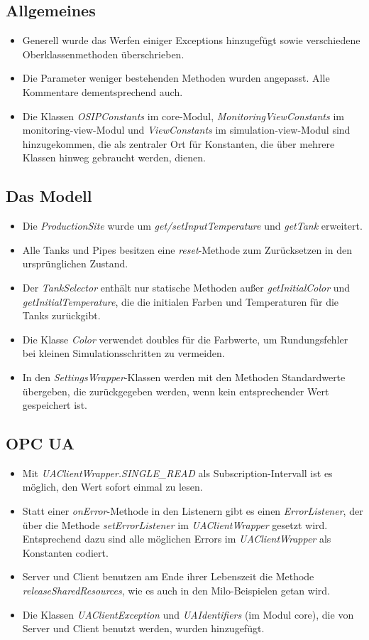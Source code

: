 \documentclass[parskip=full]{scrartcl}
\begin{document}
\subsection{Allgemeines}
\begin{itemize}
 \item Generell wurde das Werfen einiger Exceptions hinzugefügt sowie verschiedene Oberklassenmethoden überschrieben.
 \item Die Parameter weniger bestehenden Methoden wurden angepasst. Alle Kommentare dementsprechend auch.
 \item Die Klassen \emph{OSIPConstants} im core-Modul, \emph{MonitoringViewConstants} im monitoring-view-Modul und \emph{ViewConstants} im simulation-view-Modul sind hinzugekommen, die als zentraler Ort für Konstanten, die über mehrere Klassen hinweg gebraucht werden, dienen.
\end{itemize}

\subsection{Das Modell}
\begin{itemize}
 \item Die \emph{ProductionSite} wurde um \emph{get/setInputTemperature} und \emph{getTank} erweitert.
 \item Alle Tanks und Pipes besitzen eine \emph{reset}-Methode zum Zurücksetzen in den ursprünglichen Zustand.
 \item Der \emph{TankSelector} enthält nur statische Methoden außer \emph{getInitialColor} und \emph{getInitialTemperature}, die die initialen Farben und Temperaturen für die Tanks zurückgibt.
 \item Die Klasse \emph{Color} verwendet doubles für die Farbwerte, um Rundungsfehler bei kleinen Simulationsschritten zu vermeiden.
 \item In den \emph{SettingsWrapper}-Klassen werden mit den Methoden Standardwerte übergeben, die zurückgegeben werden, wenn kein entsprechender Wert gespeichert ist.
\end{itemize}

\subsection{OPC UA}
\begin{itemize}
 \item Mit \emph{UAClientWrapper.SINGLE\_READ} als Subscription-Intervall ist es möglich, den Wert sofort einmal zu lesen.
 \item Statt einer \emph{onError}-Methode in den Listenern gibt es einen \emph{ErrorListener}, der über die Methode \emph{setErrorListener} im \emph{UAClientWrapper} gesetzt wird. Entsprechend dazu sind alle möglichen Errors im \emph{UAClientWrapper} als Konstanten codiert.
 \item Server und Client benutzen am Ende ihrer Lebenszeit die Methode \emph{releaseSharedResources}, wie es auch in den Milo-Beispielen getan wird.
 \item Die Klassen \emph{UAClientException} und \emph{UAIdentifiers} (im Modul core), die von Server und Client benutzt werden, wurden hinzugefügt.
\end{itemize}
\end{document}
